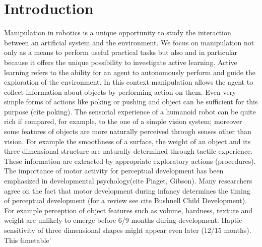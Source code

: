 \section{Introduction}
Manipulation in robotics is a unique opportunity to study the interaction between an artificial system and the environment. We focus on manipulation not only as a means to perform useful practical tasks but also and in particular because it offers the unique possibility to investigate active learning. Active learning refers to the ability for an agent to autonomously perform and guide the exploration of the environment. In this context manipulation allows the agent to collect information about objects by performing action on them. Even very simple forms of actions like poking or pushing and object can be sufficient for this purpose (cite poking).
The sensorial experience of a humanoid robot can be quite rich if compared, for example, to the one of a simple vision system; moreover some features of objects are more naturally perceived through senses other than vision. For example the smoothness of a surface, the weight of an object and its three dimensional structure are naturally determined through tactile experience. These information are extracted by appropriate exploratory actions (procedures).
The importance of motor activity for perceptual development has been emphasized in developmental psychology(cite Piaget, Gibson). Many researchers agree on the fact that motor development during infancy determines the timing of perceptual development (for a review see cite Bushnell Child Development). For example perception of object features such as volume, hardness, texture and weight are unlikely to emerge before 6/9 months during development. Haptic sensitivity of three dimensional shapes might appear even later (12/15 months). This \'timetable\'






